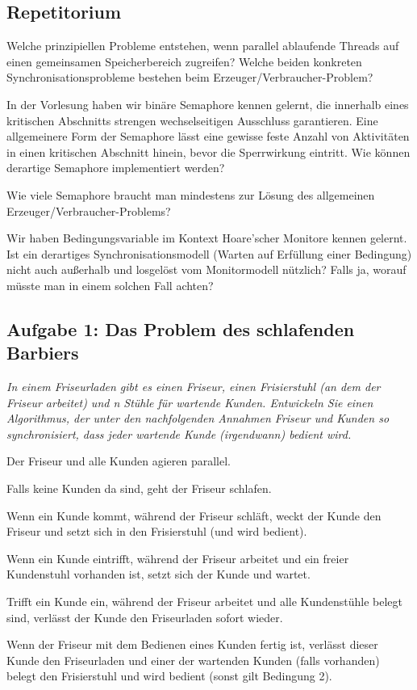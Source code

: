 \documentclass[a4paper]{article}
\begin{document}
\subsection{Repetitorium}
\begin{description*}
    \item[Welche prinzipiellen Probleme entstehen, wenn parallel ablaufende Threads auf einen gemeinsamen Speicherbereich zugreifen? Welche beiden konkreten Synchronisationsprobleme bestehen beim Erzeuger/Verbraucher-Problem?]
    \item[In der Vorlesung haben wir binäre Semaphore kennen gelernt, die innerhalb eines kritischen Abschnitts strengen wechselseitigen Ausschluss garantieren. Eine allgemeinere Form der Semaphore lässt eine gewisse feste Anzahl von Aktivitäten in einen kritischen Abschnitt hinein, bevor die Sperrwirkung eintritt. Wie können derartige Semaphore implementiert werden?]
    \item[Wie viele Semaphore braucht man mindestens zur Lösung des allgemeinen Erzeuger/Verbraucher-Problems?]
    \item[Wir haben Bedingungsvariable im Kontext Hoare’scher Monitore kennen gelernt. Ist ein derartiges Synchronisationsmodell (Warten auf Erfüllung einer Bedingung) nicht auch außerhalb und losgelöst vom Monitormodell nützlich? Falls ja, worauf müsste man in einem solchen Fall achten?]
\end{description*}
\subsection{Aufgabe 1: Das Problem des schlafenden Barbiers}
\textit{In einem Friseurladen gibt es einen Friseur, einen Frisierstuhl (an dem der Friseur arbeitet) und n Stühle für wartende Kunden. Entwickeln Sie einen Algorithmus, der unter den nachfolgenden Annahmen Friseur und Kunden so synchronisiert, dass jeder wartende Kunde (irgendwann) bedient wird.}
\begin{itemize*}
    \item Der Friseur und alle Kunden agieren parallel.
    \item Falls keine Kunden da sind, geht der Friseur schlafen.
    \item Wenn ein Kunde kommt, während der Friseur schläft, weckt der Kunde den Friseur und setzt sich in den Frisierstuhl (und wird bedient).
    \item Wenn ein Kunde eintrifft, während der Friseur arbeitet und ein freier Kundenstuhl vorhanden ist, setzt sich der Kunde und wartet.
    \item Trifft ein Kunde ein, während der Friseur arbeitet und alle Kundenstühle belegt sind, verlässt der Kunde den Friseurladen sofort wieder.
    \item Wenn der Friseur mit dem Bedienen eines Kunden fertig ist, verlässt dieser Kunde den Friseurladen und einer der wartenden Kunden (falls vorhanden) belegt den Frisierstuhl und wird bedient (sonst gilt Bedingung 2).
\end{itemize*}
\vspace{10mm}
\end{document}
